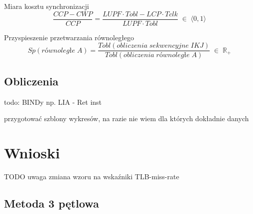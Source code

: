 \documentclass[12pt,a4paper]{article}
\begin{document}
Miara kosztu synchronizacji
\begin{equation}
\frac{CCP - CWP}{CCP} = \frac{LUPF \cdot Tobl - LCP \cdot Tclk}{LUPF \cdot Tobl}
\; \in \; \langle 0,1 \rangle
\end{equation}

Przyspieszenie przetwarzania równoległego  %
\begin{equation}
Sp(równoległe\; A) = \frac{Tobl(obliczenia\; sekwencyjne\; IKJ)}{Tobl(obliczenia\; równoległe\; A)}
\; \in \; \mathbb{R}_+
\end{equation}


\subsection{Obliczenia}
todo: BINDy np. LIA - Ret inst

przygotować szblony wykresów, na razie nie  wiem dla których dokładnie danych 









\section{Wnioski}
{\huge TODO uwaga zmiana wzoru na wskaźniki TLB-miss-rate}\\

\subsection{Metoda 3 pętlowa}
\end{document}
